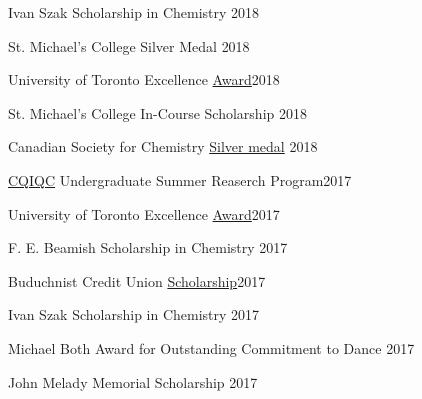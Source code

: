 \documentclass[margin,line]{res}
\begin{document}
\begin{resume}
\vspace*{-2.5mm}

Ivan Szak Scholarship in Chemistry \hfill {2018}

\vspace*{-2.5mm}

St. Michael's College Silver Medal \hfill {2018} 

\vspace*{-2.5mm}

University of Toronto Excellence \href{https://registrar.utoronto.ca/finances-and-funding/utea/}{Award}\hfill{2018}

\vspace*{-2.5mm}

St. Michael's College In-Course Scholarship \hfill {2018}

\vspace*{-2.5mm}

Canadian Society for Chemistry \href{https://www.cheminst.ca/awards/student/} {Silver medal} \hfill{2018} 

\vspace*{-2.5mm}

\href{https://cqiqc.physics.utoronto.ca/cqiqc-programs/undergraduates/}{CQIQC} Undergraduate Summer Reaserch Program\hfill{2017}

\vspace*{-2.5mm}

University of Toronto Excellence \href{https://registrar.utoronto.ca/finances-and-funding/utea/}{Award}\hfill{2017}

\vspace*{-2.5mm}

F. E. Beamish Scholarship in Chemistry \hfill{2017}

\vspace*{-2.5mm}

Buduchnist Credit Union \href{http://www.buduchnist.com/scholarships}{Scholarship}\hfill {2017}

\vspace*{-2.5mm}

Ivan Szak Scholarship in Chemistry \hfill {2017}

\vspace*{-2.5mm}

Michael Both Award for Outstanding Commitment to Dance %
\hfill {2017}

\vspace*{-2.5mm}

John Melady Memorial Scholarship \hfill{2017} 


\end{resume}
\end{document}
